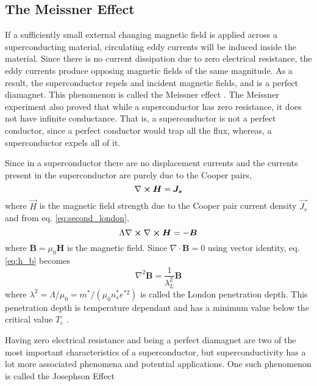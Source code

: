 \documentclass[letterpaper,english,reprint, aps]{revtex4}
\begin{document}
\subsection{The Meissner Effect}
If a sufficiently small external changing magnetic field is applied across a superconducting material, circulating eddy currents will be induced inside the material. Since there is no current dissipation due to zero electrical resistance, the eddy currents produce opposing magnetic fields of the same magnitude. As a result, the superconductor repels and incident magnetic fields, and is a perfect diamagnet. This phenomenon is called the Meissner effect \citep{feynman}. The Meissner experiment also proved that while a superconductor has zero resistance, it does not have infinite conductance. That is, a superconductor is not a perfect conductor, since a perfect conductor would trap all the flux, whereas, a superconductor expels all of it. 

Since in a superconductor there are no displacement currents and the currents present in the superconductor are purely due to the Cooper pairs,
\begin{equation}
    \nabla \cross \boldsymbol{H} = \boldsymbol{J_s}
\end{equation}
where $\Vec{H}$ is the magnetic field strength due to the Cooper pair current density $\Vec{J_s}$ and from eq. \ref{eq:second_london},
\begin{equation}
    \Lambda \nabla \cross \nabla \cross \boldsymbol{H} = - \boldsymbol{B} \label{eq:h_b}
\end{equation}
where $\boldsymbol{B} = \mu_0 \boldsymbol{H}$ is the magnetic field. Since $\nabla \cdot \boldsymbol{B} = 0$ using vector identity,  eq. \ref{eq:h_b} becomes
\begin{equation}
    \nabla^2 \boldsymbol{B} = \frac{1}{\lambda_L^2} \boldsymbol{B} 
\end{equation}
where $\lambda^2 = \Lambda/\mu_0 = m^*/(\mu_0n_s^* e^{*2})$ is called the London penetration depth. This penetration depth is temperature dependant and has a minimum value below the critical value $T_c$ \citep{feynman,vanduzer}. 

Having zero electrical resistance and being a perfect diamagnet are two of the most important characteristics of a superconductor, but superconductivity has a lot more associated phenomena and potential applications. One such phenomenon is called the Josephson Effect 
\end{document}
